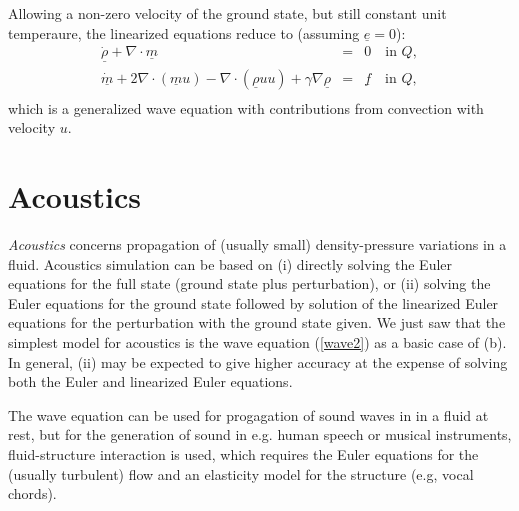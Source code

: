 Allowing a non-zero velocity of the ground state,
but still constant unit temperaure, the linearized 
equations reduce to (assuming $\underline{e}=0$):
\begin{equation}\label{wave1}
\begin{array}{rcl}
\underline{\dot\rho} +\nabla\cdot\underline{m}
&=& 0\quad \mbox{in } Q, \\
\underline{\dot m}+2\nabla\cdot (\underline{m}u)-
\nabla\cdot (\underline{\rho}uu)
+ \gamma\nabla\underline{\rho}&=&  \underline{f} \quad \mbox{in } Q, \\
\end{array} 
\end{equation}
which is a generalized wave equation with contributions from 
convection with velocity $u$.


\section{Acoustics}

\emph{Acoustics} concerns propagation of
(usually small) density-pressure variations in a fluid.
Acoustics simulation can be based on (i) directly solving the 
Euler equations for the 
full state (ground state plus perturbation), or (ii) solving
the Euler equations for the ground state followed by  
solution of the linearized Euler equations for the perturbation with the
ground state given. We just saw that the simplest model
for acoustics is the wave equation (\ref{wave2}) as a basic case of (b). 
In general, (ii) may be expected to give higher accuracy at the expense
of solving both the Euler and linearized Euler equations.

The wave equation can be used for progagation of sound waves in
in a fluid at rest, but for the generation of sound in e.g.
human speech or musical instruments, fluid-structure 
interaction is used, which requires the Euler equations for the
(usually turbulent) flow and an elasticity model for the
structure (e.g, vocal chords).  





